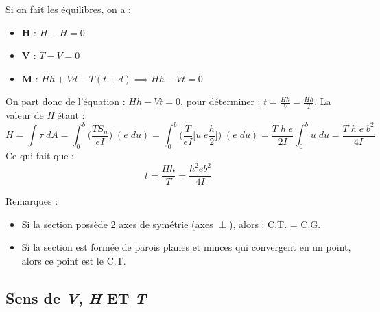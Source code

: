 \documentclass[a4paper]{article}
\begin{document}
Si on fait les équilibres, on a : 
\begin{itemize}

\item \textbf{H} : $ H - H = 0 $
\item \textbf{V} : $ T - V = 0 $
\item \textbf{M} : $ H h + V d - T (t + d) \implies H h - V t = 0 $

\end{itemize}

On part donc de l'équation : $ H h - V t = 0 $, pour déterminer : $\displaystyle t = \frac{H h}{V} = \frac{H h}{T} $. La valeur de \emph{H} étant : 
\[ H = \int \tau \; d A = \int_0^b \bigg( \frac{T S_n}{e I} \bigg) \; (e \; d u) = \int_0^b \bigg( \frac{T}{e I} \bigg[ u \; e \frac{h}{2} \bigg] \bigg) \; (e \; d u) = \frac{T \; h \; e}{2 I} \int_0^b u \; d u = \frac{T \; h \; e \; b^2}{4 I} \]
Ce qui fait que : 
\[ t = \frac{H h}{T} = \frac{h^2 e b^2}{4 I} \]


Remarques : 
\begin{itemize}

\item Si la section possède 2 axes de symétrie (axes $ \perp $), alors : C.T. = C.G.
\item Si la section est formée de parois planes et minces qui convergent en un point, alors ce point est le C.T.

\end{itemize}

\begin{center}  \end{center}





\subsection{Sens de \emph{V}, \emph{H} ET \emph{T}}
\end{document}
